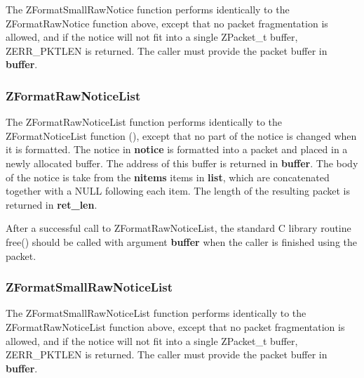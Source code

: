 The ZFormatSmallRawNotice function performs identically to the
ZFormatRawNotice function above, except that no packet fragmentation is
allowed, and if the notice will not fit into a single ZPacket_t buffer,
ZERR_PKTLEN is returned.  The caller must provide the packet buffer in
{\bf buffer}.

\subsubsection{ZFormatRawNoticeList}
\label{ZFormatRawNoticeList}

\etemplate
{}

The ZFormatRawNoticeList function performs identically to the
ZFormatNoticeList function (), except that no
part of the notice is changed when it is formatted.  The notice in {\bf
notice} is formatted into a packet and placed in a newly allocated
buffer. The address of this buffer is returned in {\bf *buffer}.  The
body of the notice is take from the {\bf nitems} items in {\bf list},
which are concatenated together with a NULL following each item.  The
length of the resulting packet is returned in {\bf *ret_len}.

After a successful call to ZFormatRawNoticeList, the standard C library routine
free() should be called with argument {\bf *buffer} when the caller is
finished using the packet.

\subsubsection{ZFormatSmallRawNoticeList}
\label{ZFormatSmallRawNoticeList}

\etemplate
{}

The ZFormatSmallRawNoticeList function performs identically to the
ZFormatRawNoticeList function above, except that no packet fragmentation is
allowed, and if the notice will not fit into a single ZPacket_t buffer,
ZERR_PKTLEN is returned.  The caller must provide the packet
buffer in {\bf buffer}.

